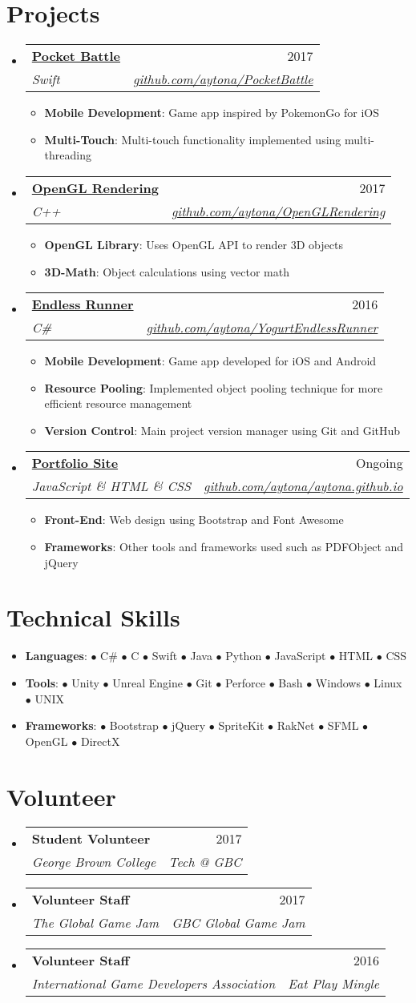 \documentclass[a4paper,11pt]{article}
\makeatletter
\newcommand{\resumeItem}[2]{
  \item\small{
    \textbf{#1}{: #2 \vspace{-2pt}}
  }
}
\newcommand{\resumeSubheading}[4]{
  \vspace{-1pt}\item
    \begin{tabular*}{0.975\textwidth}{l@{\extracolsep{\fill}}r}
      \textbf{#1} & #2 \\
      \textit{\small#3} & \textit{\small #4} \\
    \end{tabular*}\vspace{-5pt}
}
\newcommand{\resumeSubItem}[2]{\resumeItem{#1}{#2}\vspace{-4pt}}
\newcommand{\resumeSubHeadingListStart}{\begin{itemize}[leftmargin=*,label={}]}
\newcommand{\resumeSubHeadingListEnd}{\end{itemize}}
\newcommand{\resumeItemListStart}{\begin{itemize}}
\newcommand{\resumeItemListEnd}{\end{itemize}\vspace{-5pt}}
\makeatother
\begin{document}
\section{Projects}
\resumeSubHeadingListStart
	\resumeSubheading{\href{https://github.com/aytona/PocketBattle}{Pocket Battle}}{2017}{Swift}{\href{https://github.com/aytona/PocketBattle}{github.com/aytona/PocketBattle}}
	\resumeItemListStart
		\resumeItem{Mobile Development}{Game app inspired by PokemonGo for iOS}
		\resumeItem{Multi-Touch}{Multi-touch functionality implemented using multi-threading}
	\resumeItemListEnd
	\resumeSubheading{\href{https://github.com/aytona/OpenGLRendering}{OpenGL Rendering}}{2017}{C++}{\href{https://github.com/aytona/OpenGLRendering}{github.com/aytona/OpenGLRendering}}
	\resumeItemListStart
		\resumeItem{OpenGL Library}{Uses OpenGL API to render 3D objects}
		\resumeItem{3D-Math}{Object calculations using vector math}
	\resumeItemListEnd
	\resumeSubheading{\href{https://github.com/aytona/YogurtEndlessRunner}{Endless Runner}}{2016}{C\#}{\href{https://github.com/aytona/YogurtEndlessRunner}{github.com/aytona/YogurtEndlessRunner}}
	\resumeItemListStart
		\resumeItem{Mobile Development}{Game app developed for iOS and Android}
		\resumeItem{Resource Pooling}{Implemented object pooling technique for more efficient resource management}
		\resumeItem{Version Control}{Main project version manager using Git and GitHub}
	\resumeItemListEnd
	\resumeSubheading{\href{https://github.com/aytona/aytona.github.io}{Portfolio Site}}{Ongoing}{JavaScript \& HTML \& CSS}{\href{https://github.com/aytona/aytona.github.io}{github.com/aytona/aytona.github.io}}
	\resumeItemListStart
		\resumeItem{Front-End}{Web design using Bootstrap and Font Awesome}
		\resumeItem{Frameworks}{Other tools and frameworks used such as PDFObject and jQuery}
	\resumeItemListEnd
\resumeSubHeadingListEnd
\section{Technical Skills}
\resumeSubHeadingListStart
\resumeSubItem{Languages}{$\bullet$ C\# $\bullet$ C $\bullet$ Swift $\bullet$ Java $\bullet$ Python $\bullet$ JavaScript $\bullet$ HTML $\bullet$ CSS}
\resumeSubItem{Tools}{$\bullet$ Unity $\bullet$ Unreal Engine $\bullet$ Git $\bullet$ Perforce $\bullet$ Bash $\bullet$ Windows $\bullet$ Linux $\bullet$ UNIX}
\resumeSubItem{Frameworks}{$\bullet$ Bootstrap $\bullet$ jQuery $\bullet$ SpriteKit $\bullet$ RakNet $\bullet$ SFML $\bullet$ OpenGL $\bullet$ DirectX}
\resumeSubHeadingListEnd
\section{Volunteer}
\resumeSubHeadingListStart
\resumeSubheading{Student Volunteer}{2017}{George Brown College}{Tech @ GBC}
\resumeSubheading{Volunteer Staff}{2017}{The Global Game Jam}{GBC Global Game Jam}
\resumeSubheading{Volunteer Staff}{2016}{International Game Developers Association}{Eat Play Mingle}
\resumeSubHeadingListEnd
\end{document}
